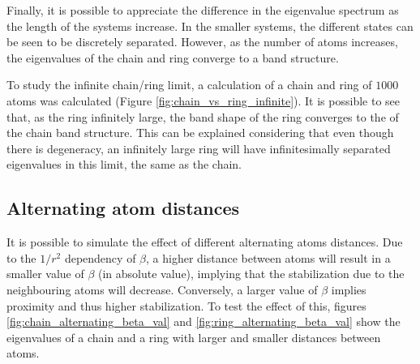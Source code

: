 \documentclass[twocolumn]{article}
\begin{document}
Finally, it is possible to appreciate the difference in the eigenvalue spectrum as the length of the systems increase. In the smaller systems, the different states can be seen to be discretely separated. However, as the number of atoms increases, the eigenvalues of the chain and ring converge to a band structure. 

To study the infinite chain/ring limit, a calculation of a chain and ring of $1000$ atoms was calculated (Figure \ref{fig:chain_vs_ring_infinite}). It is possible to see that, as the ring infinitely large, the band shape of the ring converges to the of the chain band structure. This can be explained considering that even though there is degeneracy, an infinitely large ring will have infinitesimally separated eigenvalues in this limit, the same as the chain. 

\subsection{Alternating atom distances}
It is possible to simulate the effect of different alternating atoms distances. Due to the $1/r^2$ dependency of $\beta$, a higher distance between atoms will result in a smaller value of $\beta$ (in absolute value), implying that the stabilization due to the neighbouring atoms will decrease. Conversely, a larger value of $\beta$ implies proximity and thus higher stabilization. To test the effect of this, figures \ref{fig:chain_alternating_beta_val} and \ref{fig:ring_alternating_beta_val} show the eigenvalues of a chain and a ring with larger and smaller distances between atoms.
\end{document}
